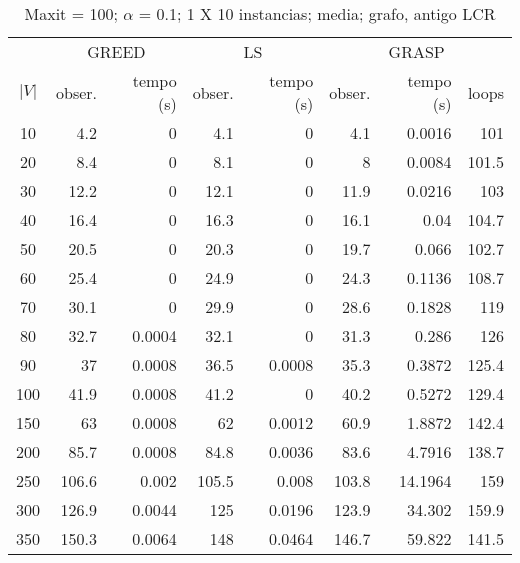 \documentclass[]{article}
\begin{document}
\begin {table}[h]
\centering
\caption{Maxit = 100; $\alpha$ = 0.1; 1 X 10 instancias; media; grafo, antigo LCR}
\begin{small}
	\begin{tabular}{|c|r|r|r|r|r|r|r|}
		\hline
		& \multicolumn{2}{c|}{GREED} & \multicolumn{2}{c|}{LS} & \multicolumn{3}{c|}{GRASP} \\ 
		\cline{2-8}
		$|V|$   &  obser. & tempo (s)  & obser. & tempo (s) & obser. & tempo (s) & loops\\ 
		\hline
		10 & 4.2 & 0 & 4.1 & 0 & 4.1 & 0.0016 & 101 \\ 
		20 & 8.4 & 0 & 8.1 & 0 & 8 & 0.0084 & 101.5 \\ 
		30 & 12.2 & 0 & 12.1 & 0 & 11.9 & 0.0216 & 103 \\ 
		40 & 16.4 & 0 & 16.3 & 0 & 16.1 & 0.04 & 104.7 \\ 
		50 & 20.5 & 0 & 20.3 & 0 & 19.7 & 0.066 & 102.7 \\ 
		60 & 25.4 & 0 & 24.9 & 0 & 24.3 & 0.1136 & 108.7 \\ 
		70 & 30.1 & 0 & 29.9 & 0 & 28.6 & 0.1828 & 119 \\ 
		80 & 32.7 & 0.0004 & 32.1 & 0 & 31.3 & 0.286 & 126 \\ 
		90 & 37 & 0.0008 & 36.5 & 0.0008 & 35.3 & 0.3872 & 125.4 \\ 
		100 & 41.9 & 0.0008 & 41.2 & 0 & 40.2 & 0.5272 & 129.4 \\ 
		150 & 63 & 0.0008 & 62 & 0.0012 & 60.9 & 1.8872 & 142.4 \\ 
		200 & 85.7 & 0.0008 & 84.8 & 0.0036 & 83.6 & 4.7916 & 138.7 \\ 
		250 & 106.6 & 0.002 & 105.5 & 0.008 & 103.8 & 14.1964 & 159 \\ 
		300 & 126.9 & 0.0044 & 125 & 0.0196 & 123.9 & 34.302 & 159.9 \\ 
		350 & 150.3 & 0.0064 & 148 & 0.0464 & 146.7 & 59.822 & 141.5 \\ 
		\hline
	\end{tabular} \label{}
\end{small}
\end{table}
\end{document}
